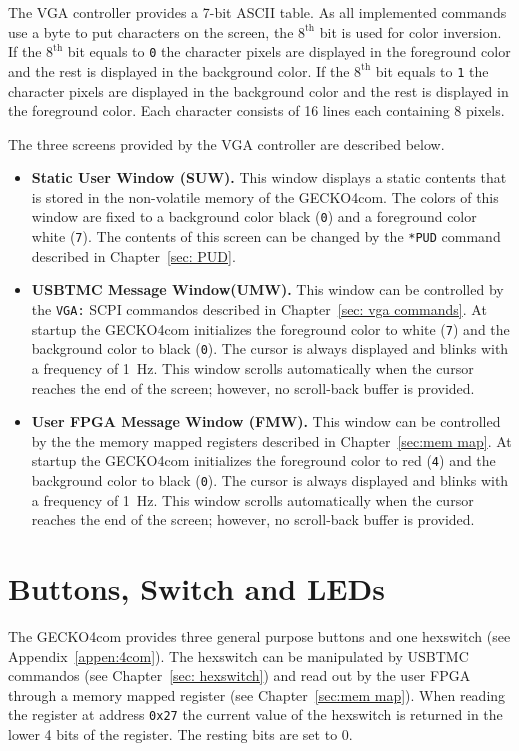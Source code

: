 The VGA controller provides a 7-bit {\sc ASCII} table. As all implemented
commands use a byte to put characters on the screen, the $8^{\text{th}}$ bit is
used for color inversion. If the $8^{\text{th}}$ bit equals to \verb+0+ the character
pixels are displayed in the foreground color and the rest is displayed in the
background color. If the $8^{\text{th}}$ bit equals to \verb+1+ the character
pixels are displayed in the background color and the rest is displayed in the
foreground color. Each character consists of 16 lines each containing 8 pixels.

The three screens provided by the VGA controller are described below.
\begin{itemize}
\item \textbf{Static User Window (SUW).} This window displays a static contents
that is stored in the non-volatile memory of the {\sc GECKO4com}. The colors of
this window are fixed to a background color black (\verb+0+) and a foreground
color white (\verb+7+). The contents of this screen can be changed by the
\verb+*PUD+ command described in Chapter~\ref{sec: PUD}.
\item \textbf{USBTMC Message Window(UMW).} This window can be controlled by the
\verb+VGA:+ SCPI commandos described in Chapter~\ref{sec: vga commands}. At
startup the {\sc GECKO4com} initializes the foreground color to white (\verb+7+)
and the background color to black (\verb+0+). The cursor is always displayed and
blinks with a frequency of 1~Hz. This window scrolls automatically when the
cursor reaches the end of the screen; however, no scroll-back buffer is
provided.
\item \textbf{User FPGA Message Window (FMW).} This window can be controlled by the
the memory mapped registers described in Chapter~\ref{sec:mem map}. At
startup the {\sc GECKO4com} initializes the foreground color to red (\verb+4+)
and the background color to black (\verb+0+). The cursor is always displayed and
blinks with a frequency of 1~Hz. This window scrolls automatically when the
cursor reaches the end of the screen; however, no scroll-back buffer is
provided.
\end{itemize}
\section{Buttons, Switch and LEDs}
\label{sec:but switch}
The {\sc GECKO4com} provides three general purpose buttons and one hexswitch
(see Appendix~\ref{appen:4com}). The hexswitch can be manipulated by USBTMC
commandos (see Chapter~\ref{sec: hexswitch}) and read out by the user FPGA
through a memory mapped register (see Chapter~\ref{sec:mem map}). When reading
the register at address \verb+0x27+ the current value of the hexswitch is
returned in the lower 4 bits of the register. The resting bits are set to 0.

